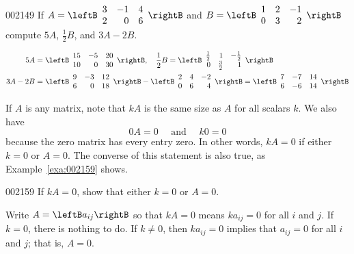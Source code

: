 \begin{example}{}{002149}
If $A = \leftB \begin{array}{rrr}
3 & -1 & 4 \\
2 & 0 & 6
\end{array} \rightB$
 and $ B = \leftB \begin{array}{rrr}
 1 & 2 & -1 \\
 0 & 3 & 2
 \end{array} \rightB$
 compute $5A$, $\frac{1}{2}B$, and $3A - 2B$.


\begin{solution}
\begin{align*}
5A &= \leftB \begin{array}{rrr}
15 & -5 & 20 \\
10 & 0 & 30
\end{array} \rightB, \quad \frac{1}{2}B = \leftB \begin{array}{rrr}
\frac{1}{2} & 1 & -\frac{1}{2} \\
0 & \frac{3}{2} & 1
\end{array} \rightB \\
3A - 2B &= \leftB \begin{array}{rrr}
9 & -3 & 12 \\
6 & 0 & 18
\end{array} \rightB - \leftB \begin{array}{rrr}
2 & 4 & -2 \\
0 & 6 & 4
\end{array} \rightB = \leftB \begin{array}{rrr}
7 & -7 & 14 \\
6 & -6 & 14
\end{array} \rightB
\end{align*}
\end{solution}
\end{example}

If $A$ is any matrix, note that $kA$ is the same size as $A$ for all scalars $k$. We also have
\begin{equation*}
0A = 0 \quad \mbox{ and } \quad k0 = 0
\end{equation*}
because the zero matrix has every entry zero. In other words, $kA = 0$ if either $k = 0$ or $A = 0$. The converse of this statement is also true, as Example~\ref{exa:002159} shows.


\begin{example}{}{002159}
If $kA = 0$, show that either $k = 0$ or $A = 0$.


\begin{solution}
  Write $A = \leftB a_{ij} \rightB$ so that $kA = 0$ means $ka_{ij} = 0$ for all $i$ and $j$. If $k = 0$, there is nothing to do. If $k \neq 0$, then $ka_{ij} = 0$ implies that $a_{ij} = 0$ for all $i$ and $j$; that is, $A = 0$.
\end{solution}
\end{example}


